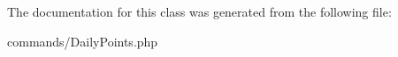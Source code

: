 

The documentation for this class was generated from the following file\+:\begin{DoxyCompactItemize}
\item 
commands/Daily\+Points.\+php\end{DoxyCompactItemize}
